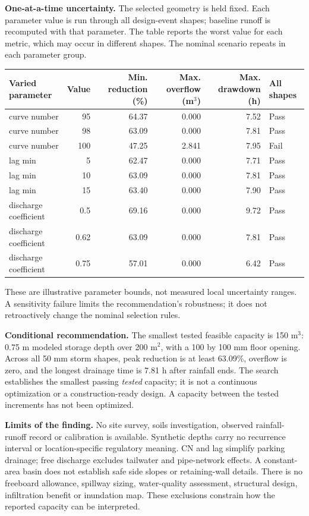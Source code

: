\documentclass[10pt,letterpaper]{article}
\newcommand{\pagetitle}[1]{\vspace*{2pt}{\Large\bfseries\color{ink}#1}\par\vspace{5pt}}
\begin{document}
\textbf{One-at-a-time uncertainty.} The selected geometry is held fixed. Each parameter value is run through all design-event shapes; baseline runoff is recomputed with that parameter. The table reports the worst value for each metric, which may occur in different shapes. The nominal scenario repeats in each parameter group.
\begin{center}\small\begin{tabular}{lrrrrl}\toprule
Varied parameter & Value & Min. reduction (\%) & Max. overflow (m$^3$) & Max. drawdown (h) & All shapes \\\midrule
curve number & 95 & 64.37 & 0.000 & 7.52 & Pass \\
curve number & 98 & 63.09 & 0.000 & 7.81 & Pass \\
curve number & 100 & 47.25 & 2.841 & 7.95 & Fail \\
lag min & 5 & 62.47 & 0.000 & 7.71 & Pass \\
lag min & 10 & 63.09 & 0.000 & 7.81 & Pass \\
lag min & 15 & 63.40 & 0.000 & 7.90 & Pass \\
discharge coefficient & 0.5 & 69.16 & 0.000 & 9.72 & Pass \\
discharge coefficient & 0.62 & 63.09 & 0.000 & 7.81 & Pass \\
discharge coefficient & 0.75 & 57.01 & 0.000 & 6.42 & Pass \\
\bottomrule\end{tabular}\end{center}
These are illustrative parameter bounds, not measured local uncertainty ranges. A sensitivity failure limits the recommendation's robustness; it does not retroactively change the nominal selection rules.
\newpage
\pagetitle{Recommendation, limitations, and review record}
\textbf{Conditional recommendation.} The smallest tested feasible capacity is 150 m$^3$: 0.75 m modeled storage depth over 200 m$^2$, with a 100 by 100 mm floor opening. Across all 50 mm storm shapes, peak reduction is at least 63.09\%, overflow is zero, and the longest drainage time is 7.81 h after rainfall ends. The search establishes the smallest passing \emph{tested} capacity; it is not a continuous optimization or a construction-ready design. A capacity between the tested increments has not been optimized.

\textbf{Limits of the finding.} No site survey, soils investigation, observed rainfall-runoff record or calibration is available. Synthetic depths carry no recurrence interval or location-specific regulatory meaning. CN and lag simplify parking drainage; free discharge excludes tailwater and pipe-network effects. A constant-area basin does not establish safe side slopes or retaining-wall details. There is no freeboard allowance, spillway sizing, water-quality assessment, structural design, infiltration benefit or inundation map. These exclusions constrain how the reported capacity can be interpreted.
\end{document}
